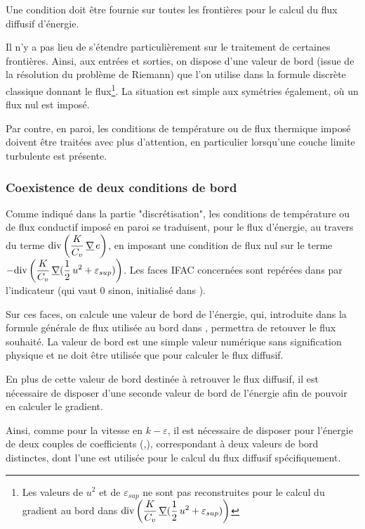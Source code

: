 Une condition doit \^etre fournie sur toutes les fronti\`eres pour le calcul du
flux diffusif d'\'energie.

Il n'y a pas lieu de
s'\'etendre particuli\`erement sur le traitement de certaines fronti\`eres.
Ainsi, aux entr\'ees et sorties, on dispose
d'une valeur de bord (issue de la r\'esolution du probl\`eme
de Riemann)
que l'on utilise dans la formule discr\`ete classique donnant le
flux\footnote{Les valeurs de $u^2$ et de $\varepsilon_{sup}$ ne sont pas
reconstruites pour le calcul du gradient au bord dans
$\displaystyle\text{div}\,{\left(\frac{K}{C_v}\,\underline{\nabla}{(\frac{1}{2}\,u^2+\varepsilon_{sup})}\right)}$}.
La situation est simple aux sym\'etries \'egalement, o\`u un flux nul est impos\'e.

Par contre, en paroi, les conditions de temp\'erature ou de flux thermique
impos\'e doivent \^etre trait\'ees avec plus d'attention, en particulier
lorsqu'une couche limite turbulente est pr\'esente.

\subsubsection*{Coexistence de deux conditions de bord}

Comme indiqu\'e dans la partie "discr\'etisation",
les conditions de temp\'erature ou de flux conductif
impos\'e en paroi se traduisent,
pour le flux d'\'energie, au travers du terme
$\displaystyle\text{div}\,{\left(\frac{K}{C_v}\,\underline{\nabla}\,e\right)}$,
en imposant une condition de flux nul sur le terme
$\displaystyle-\text{div}\,{\left(\frac{K}{C_v}\,\underline{\nabla}{(\frac{1}{2}\,u^2+\varepsilon_{sup})}\right)}$.
Les faces IFAC
concern\'ees sont rep\'er\'ees dans  par l'indicateur
 (qui vaut 0 sinon, initialis\'e
dans ).

Sur ces faces,
on calcule une valeur de bord de l'\'energie, qui, introduite dans la
formule g\'en\'erale de flux utilis\'ee au bord dans \CS, permettra de retouver le
flux souhait\'e. La valeur de bord est une simple valeur num\'erique sans
signification physique et ne doit \^etre utilis\'ee que pour calculer le flux
diffusif.

En plus de cette valeur de bord destin\'ee \`a retrouver le
flux diffusif, il est n\'ecessaire de disposer
d'une seconde valeur de bord de l'\'energie afin de pouvoir en calculer le
gradient.

Ainsi, comme pour la vitesse en $k-\varepsilon$, il est n\'ecessaire de
disposer pour l'\'energie de deux couples de coefficients
(,), correspondant \`a deux valeurs de bord distinctes,
dont l'une est utilis\'ee pour le calcul du flux diffusif sp\'ecifiquement.

